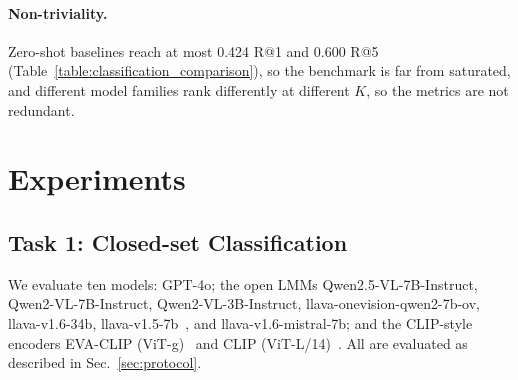 \documentclass[sigconf, nonacm]{acmart}
\begin{document}
\paragraph{Non-triviality.} Zero-shot baselines reach at most 0.424 R@1 and 0.600 R@5 (Table~\ref{table:classification_comparison}), so the benchmark is far from saturated, and different model families rank differently at different $K$, so the metrics are not redundant.

\section{Experiments}
\subsection{Task 1: Closed-set Classification}
We evaluate ten models: GPT-4o; the open LMMs Qwen2.5-VL-7B-Instruct, Qwen2-VL-7B-Instruct, Qwen2-VL-3B-Instruct, llava-onevision-qwen2-7b-ov, llava-v1.6-34b, llava-v1.5-7b~\cite{liu2024improved}, and llava-v1.6-mistral-7b; and the CLIP-style encoders EVA-CLIP (ViT-g)~\cite{sun2023eva} and CLIP (ViT-L/14)~\cite{CLIP}. All are evaluated as described in Sec.~\ref{sec:protocol}.

\begin{table}[t]
  \centering
  \caption{Classification performance on FoodLogAthl-218 (Task~1). Bold marks the best value per column.}
  \label{table:classification_comparison}
\end{table}
\end{document}

